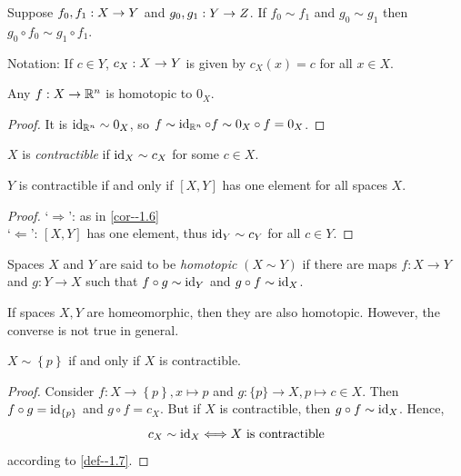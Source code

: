 \documentclass[a4paper,11pt]{article}
\begin{document}
		\begin{lemma}\label{lem--1.5}
		Suppose $f_0,f_1:X\rightarrow Y$ and $g_0,g_1:Y\rightarrow Z$. If $f_0\sim f_1$ and $g_0\sim g_1$ then $g_0\circ f_0\sim g_1\circ f_1$.
		\end{lemma}
		
		Notation: If $c\in Y$, $c_X:X\rightarrow Y$ is given by $c_X(x)=c$ for all $x\in X$.
		
		\begin{cor}\label{cor--1.6}
			Any $f:X\rightarrow\mathbb{R}^n$ is homotopic to $0_X$.
		\end{cor}
		\begin{proof}
			It is $\operatorname{id}_{\mathbb{R}^n}\sim 0_X$, so $f\sim\operatorname{id}_{\mathbb{R}^n}\circ f\sim 0_X\circ f=0_X$. 
		\end{proof}
		
		\begin{defi}\label{def--1.7}
			$X$ is \textit{contractible} if $\operatorname{id}_X\sim c_X$ for some $c\in X$.
		\end{defi}
		
		\begin{prop}
			$Y$ is contractible if and only if $[X,Y]$ has one element for all spaces $X$.
		\end{prop}
		\begin{proof}
			`$\Longrightarrow$': as in \autoref{cor--1.6}\\
			`$\Longleftarrow$': $[X,Y]$ has one element, thus $\operatorname{id}_Y\sim c_Y$ for all $c\in Y$.
		\end{proof}
		
		\begin{defi}
			Spaces $X$ and $Y$ are said to be \textit{homotopic} $(X\sim Y)$ if there are maps $f:X\rightarrow Y$ and $g:Y\rightarrow X$ such that $f \circ g\sim\operatorname{id}_{Y}$ and $g \circ f\sim\operatorname{id}_{X}$.
		\end{defi}

		\begin{remark}
			If spaces $X,Y$ are homeomorphic, then they are also homotopic. However, the converse is not true in general.
		\end{remark}
		
		\begin{eg}\label{ex--contractible}
			$X\sim \left\{ p\right\}$ if and only if $X$ is contractible.
		\end{eg}
		\begin{proof}
			Consider $f:X\rightarrow \left\{ p\right\}, x\mapsto p$ and $g:\{p\} \rightarrow X,p\mapsto c\in X$. Then $f \circ g=\operatorname{id}_{\{p\}}$ and $g \circ f=c_{X}$. But if $X$ is contractible, then $g \circ f\sim\operatorname{id}_{X}$. Hence,
			\begin{equation}
				c_{X}\sim\operatorname{id}_{X}\Longleftrightarrow X\text{ is contractible}
			\end{equation}
			according to \autoref{def--1.7}.
		\end{proof}
		
\end{document}
